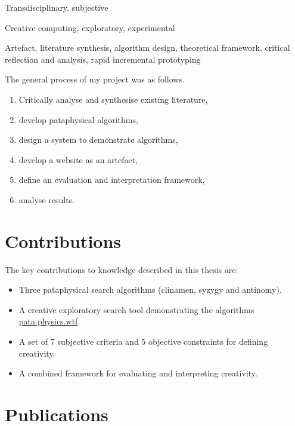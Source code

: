 \begin{description}[leftmargin=3cm]
  \item [Epistemology] Transdisciplinary, subjective
  \item [Methodology] Creative computing, exploratory, experimental
  \item [Methods] Artefact, literature synthesis, algorithm design, theoretical framework, critical reflection and analysis, rapid incremental prototyping
\end{description}

The general process of my project was as follows.

\begin{enumerate}
  \item Critically analyse and synthesise existing literature,\marginpar{\textspiral~\ref{p:lit}}
  \item develop pataphysical algorithms,\marginpar{\textspiral~\ref{p:practice}}
  \item design a system to demonstrate algorithms,\marginpar{\textspiral~\ref{p:practice}}
  \item develop a website as an artefact,\marginpar{\textspiral~\ref{p:practice}}
  \item define an evaluation and interpretation framework,\marginpar{\textspiral~\ref{p:theory}}
  \item analyse results.\marginpar{\textspiral~\ref{p:analysis}}
\end{enumerate}


\section{Contributions}

The key contributions to knowledge described in this thesis are:

\begin{itemize}
  \item Three pataphysical search algorithms (clinamen, syzygy and antinomy).
  \item A creative exploratory search tool demonstrating the algorithms \url{pata.physics.wtf}.
  \item A set of 7 subjective criteria and 5 objective constraints for defining creativity.
  \item A combined framework for evaluating and interpreting creativity.
\end{itemize}


\section{Publications}

